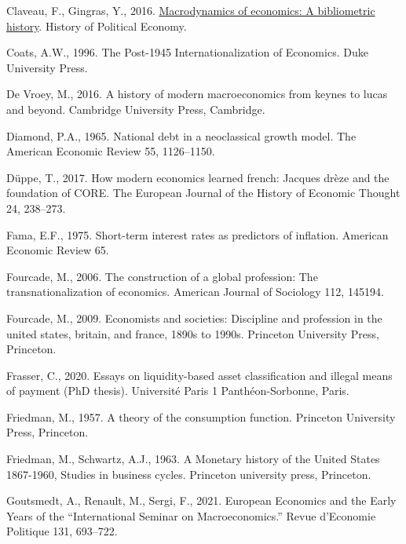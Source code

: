 \documentclass[]{elsarticle} %
\newlength{\cslhangindent}
\newlength{\cslentryspacingunit} %
\newenvironment{CSLReferences}[2] %
 {%
  \setlength{\parindent}{0pt}
  \ifodd #1
  \let\oldpar\par
  \def\par{\hangindent=\cslhangindent\oldpar}
  \fi
  \setlength{\parskip}{#2\cslentryspacingunit}
 }%
 {}
\begin{document}
\begin{CSLReferences}{1}{0}
\leavevmode{}%
Claveau, F., Gingras, Y., 2016.
\href{http://hope.dukejournals.org/cgi/content/short/48/4/551?rss=1}{Macrodynamics
of economics: A bibliometric history}. History of Political Economy.

\leavevmode{}%
Coats, A.W., 1996. The Post-1945 Internationalization of Economics. Duke
University Press.

\leavevmode{}%
De Vroey, M., 2016. A history of modern macroeconomics from keynes to
lucas and beyond. Cambridge University Press, Cambridge.

\leavevmode{}%
Diamond, P.A., 1965. National debt in a neoclassical growth model. The
American Economic Review 55, 1126--1150.

\leavevmode{}%
Düppe, T., 2017. How modern economics learned french: Jacques drèze and
the foundation of CORE. The European Journal of the History of Economic
Thought 24, 238--273.

\leavevmode{}%
Fama, E.F., 1975. Short-term interest rates as predictors of inflation.
American Economic Review 65.

\leavevmode{}%
Fourcade, M., 2006. The construction of a global profession: The
transnationalization of economics. American Journal of Sociology 112,
145194.

\leavevmode{}%
Fourcade, M., 2009. Economists and societies: Discipline and profession
in the united states, britain, and france, 1890s to 1990s. Princeton
University Press, Princeton.

\leavevmode{}%
Frasser, C., 2020. Essays on liquidity-based asset classiﬁcation and
illegal means of payment (PhD thesis). Université Paris 1
Panthéon-Sorbonne, Paris.

\leavevmode{}%
Friedman, M., 1957. A theory of the consumption function. Princeton
University Press, Princeton.

\leavevmode{}%
Friedman, M., Schwartz, A.J., 1963. A {Monetary} history of the {United}
{States} 1867-1960, Studies in business cycles. Princeton university
press, Princeton.

\leavevmode{}%
Goutsmedt, A., Renault, M., Sergi, F., 2021. European {Economics} and
the {Early Years} of the {``{International Seminar} on
{Macroeconomics}.''} Revue d'Economie Politique 131, 693--722.


\end{CSLReferences}
\end{document}

